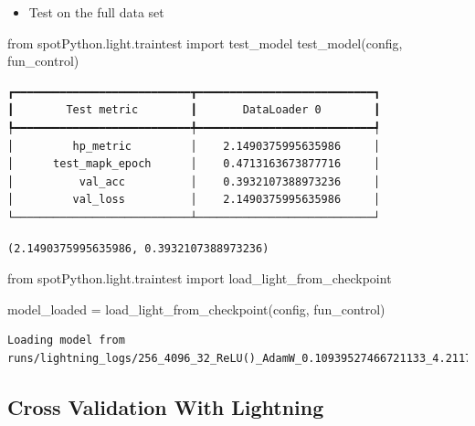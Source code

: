 \documentclass[
  letterpaper,
  DIV=11,
  numbers=noendperiod]{scrreprt}
\newenvironment{Shaded}{\begin{snugshade}}{\end{snugshade}}
\newcommand{\ImportTok}[1]{\textcolor[rgb]{0.00,0.46,0.62}{#1}}
\newcommand{\NormalTok}[1]{\textcolor[rgb]{0.00,0.23,0.31}{#1}}
\newcommand{\OperatorTok}[1]{\textcolor[rgb]{0.37,0.37,0.37}{#1}}
\providecommand{\tightlist}{%
  \setlength{\itemsep}{0pt}\setlength{\parskip}{0pt}}\usepackage{longtable,booktabs,array}
\begin{document}
\begin{itemize}
\tightlist
\item
  Test on the full data set
\end{itemize}

\begin{Shaded}
\begin{Highlighting}[]
\ImportTok{from}\NormalTok{ spotPython.light.traintest }\ImportTok{import}\NormalTok{ test\_model}
\NormalTok{test\_model(config, fun\_control)}
\end{Highlighting}
\end{Shaded}

\begin{verbatim}
┏━━━━━━━━━━━━━━━━━━━━━━━━━━━┳━━━━━━━━━━━━━━━━━━━━━━━━━━━┓
┃        Test metric        ┃       DataLoader 0        ┃
┡━━━━━━━━━━━━━━━━━━━━━━━━━━━╇━━━━━━━━━━━━━━━━━━━━━━━━━━━┩
│         hp_metric         │    2.1490375995635986     │
│      test_mapk_epoch      │    0.4713163673877716     │
│          val_acc          │    0.3932107388973236     │
│         val_loss          │    2.1490375995635986     │
└───────────────────────────┴───────────────────────────┘
\end{verbatim}

\begin{verbatim}
(2.1490375995635986, 0.3932107388973236)
\end{verbatim}

\begin{Shaded}
\begin{Highlighting}[]
\ImportTok{from}\NormalTok{ spotPython.light.traintest }\ImportTok{import}\NormalTok{ load\_light\_from\_checkpoint}

\NormalTok{model\_loaded }\OperatorTok{=}\NormalTok{ load\_light\_from\_checkpoint(config, fun\_control)}
\end{Highlighting}
\end{Shaded}

\begin{verbatim}
Loading model from runs/lightning_logs/256_4096_32_ReLU()_AdamW_0.10939527466721133_4.211776903906428_16_Default_TEST/checkpoints/last.ckpt
\end{verbatim}

\hypertarget{cross-validation-with-lightning}{%
\subsection{Cross Validation With
Lightning}\label{cross-validation-with-lightning}}
\end{document}

